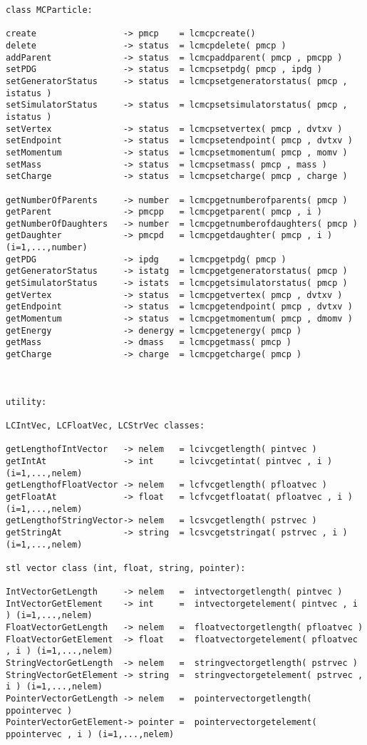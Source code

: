 \begin{scriptsize}
\begin{verbatim}
class MCParticle:

create                 -> pmcp    = lcmcpcreate()
delete                 -> status  = lcmcpdelete( pmcp )
addParent              -> status  = lcmcpaddparent( pmcp , pmcpp )
setPDG                 -> status  = lcmcpsetpdg( pmcp , ipdg )
setGeneratorStatus     -> status  = lcmcpsetgeneratorstatus( pmcp , istatus )
setSimulatorStatus     -> status  = lcmcpsetsimulatorstatus( pmcp , istatus )
setVertex              -> status  = lcmcpsetvertex( pmcp , dvtxv )
setEndpoint            -> status  = lcmcpsetendpoint( pmcp , dvtxv )
setMomentum            -> status  = lcmcpsetmomentum( pmcp , momv )
setMass                -> status  = lcmcpsetmass( pmcp , mass )
setCharge              -> status  = lcmcpsetcharge( pmcp , charge )

getNumberOfParents     -> number  = lcmcpgetnumberofparents( pmcp )
getParent              -> pmcpp   = lcmcpgetparent( pmcp , i )
getNumberOfDaughters   -> number  = lcmcpgetnumberofdaughters( pmcp )
getDaughter            -> pmcpd   = lcmcpgetdaughter( pmcp , i )  (i=1,...,number)
getPDG                 -> ipdg    = lcmcpgetpdg( pmcp )
getGeneratorStatus     -> istatg  = lcmcpgetgeneratorstatus( pmcp )
getSimulatorStatus     -> istats  = lcmcpgetsimulatorstatus( pmcp )
getVertex              -> status  = lcmcpgetvertex( pmcp , dvtxv )
getEndpoint            -> status  = lcmcpgetendpoint( pmcp , dvtxv )
getMomentum            -> status  = lcmcpgetmomentum( pmcp , dmomv )
getEnergy              -> denergy = lcmcpgetenergy( pmcp )
getMass                -> dmass   = lcmcpgetmass( pmcp )
getCharge              -> charge  = lcmcpgetcharge( pmcp )



utility: 

LCIntVec, LCFloatVec, LCStrVec classes:

getLengthofIntVector   -> nelem   = lcivcgetlength( pintvec )
getIntAt               -> int     = lcivcgetintat( pintvec , i ) (i=1,...,nelem)
getLengthofFloatVector -> nelem   = lcfvcgetlength( pfloatvec )
getFloatAt             -> float   = lcfvcgetfloatat( pfloatvec , i ) (i=1,...,nelem)
getLengthofStringVector-> nelem   = lcsvcgetlength( pstrvec )
getStringAt            -> string  = lcsvcgetstringat( pstrvec , i ) (i=1,...,nelem)

stl vector class (int, float, string, pointer):

IntVectorGetLength     -> nelem   =  intvectorgetlength( pintvec )
IntVectorGetElement    -> int     =  intvectorgetelement( pintvec , i ) (i=1,...,nelem)
FloatVectorGetLength   -> nelem   =  floatvectorgetlength( pfloatvec )
FloatVectorGetElement  -> float   =  floatvectorgetelement( pfloatvec , i ) (i=1,...,nelem)
StringVectorGetLength  -> nelem   =  stringvectorgetlength( pstrvec )
StringVectorGetElement -> string  =  stringvectorgetelement( pstrvec , i ) (i=1,...,nelem)
PointerVectorGetLength -> nelem   =  pointervectorgetlength( ppointervec )
PointerVectorGetElement-> pointer =  pointervectorgetelement( ppointervec , i ) (i=1,...,nelem)

\end{verbatim}

\end{scriptsize}

